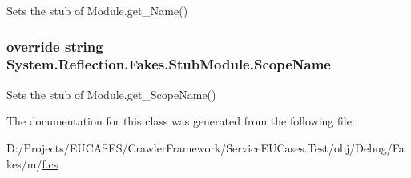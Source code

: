 Sets the stub of Module.\-get\-\_\-\-Name()

\hypertarget{class_system_1_1_reflection_1_1_fakes_1_1_stub_module_a833814e2dc724e4cc2f87c9372d238b0}{
\subsubsection[{Scope\-Name}]{\setlength{\rightskip}{0pt plus 5cm}override string System.\-Reflection.\-Fakes.\-Stub\-Module.\-Scope\-Name\hspace{0.3cm}{\ttfamily [get]}}}\label{class_system_1_1_reflection_1_1_fakes_1_1_stub_module_a833814e2dc724e4cc2f87c9372d238b0}


Sets the stub of Module.\-get\-\_\-\-Scope\-Name()



The documentation for this class was generated from the following file\-:\begin{DoxyCompactItemize}
\item 
D\-:/\-Projects/\-E\-U\-C\-A\-S\-E\-S/\-Crawler\-Framework/\-Service\-E\-U\-Cases.\-Test/obj/\-Debug/\-Fakes/m/\hyperlink{m_2f_8cs}{f.\-cs}\end{DoxyCompactItemize}
